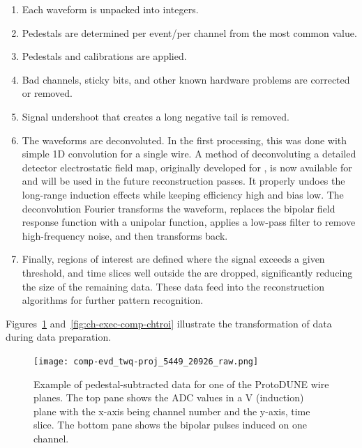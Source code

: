 \begin{enumerate}
\item Each waveform is unpacked into integers.
\item Pedestals are determined per event/per channel from the most common  value. 
\item Pedestals and calibrations are applied. %
\item Bad channels, sticky bits, and other known hardware problems are corrected or removed.
\item Signal undershoot that creates a long negative tail is removed. 
\item The waveforms  are deconvoluted.  In the first processing, this was done with simple 1D  convolution for a single wire.  A \twod  method of deconvoluting a detailed detector electrostatic field map, originally developed for \cite{Adams:2018dra}, is  now available for  and will be used in the future reconstruction passes.  It properly undoes the long-range induction effects while keeping efficiency high and bias low.  The deconvolution Fourier transforms the waveform, replaces the  bipolar field response function with a unipolar function, applies a low-pass filter to remove high-frequency noise, and then transforms back.





\item Finally, regions of interest are defined where the signal exceeds a given threshold, and time slices well outside the  are dropped, significantly reducing the size of the remaining data. These data feed into the reconstruction algorithms for further pattern recognition. %
\end{enumerate}


Figures~\ref{fig:ch-exec-comp-chtraw} and~\ref{fig:ch-exec-comp-chtroi} illustrate the transformation of  data  during data preparation.

\begin{figure}[t]
\texttt{[image: comp-evd\_twq-proj\_5449\_20926\_raw.png]}
\caption{Example of pedestal-subtracted data for one of the ProtoDUNE  wire planes.  The top pane shows the ADC values in a V (induction) plane with the x-axis being channel number and the y-axis, time slice. The bottom pane shows the bipolar pulses induced on one channel. 
}
\label{fig:ch-exec-comp-chtraw}
\end{figure}


